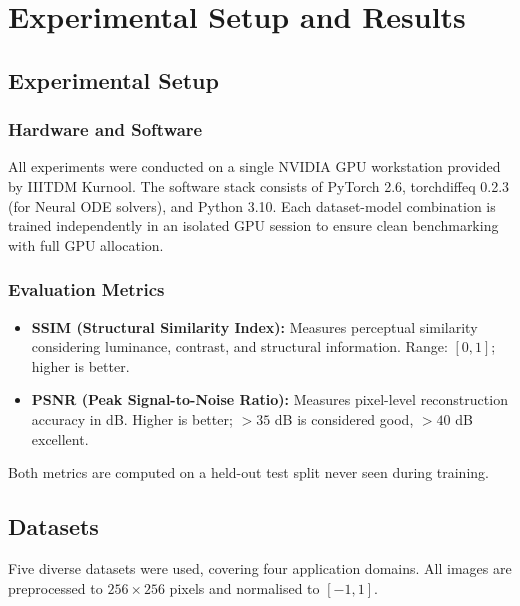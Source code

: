 \chapter{Experimental Setup and Results}
\label{Chapter5}

\section{Experimental Setup}

\subsection{Hardware and Software}

All experiments were conducted on a single NVIDIA GPU workstation provided by IIITDM Kurnool. The software stack consists of PyTorch 2.6, torchdiffeq 0.2.3 (for Neural ODE solvers), and Python 3.10. Each dataset-model combination is trained independently in an isolated GPU session to ensure clean benchmarking with full GPU allocation.

\subsection{Evaluation Metrics}

\begin{itemize}
    \item \textbf{SSIM (Structural Similarity Index):} Measures perceptual similarity considering luminance, contrast, and structural information. Range: $[0, 1]$; higher is better.
    \item \textbf{PSNR (Peak Signal-to-Noise Ratio):} Measures pixel-level reconstruction accuracy in dB. Higher is better; $>35$ dB is considered good, $>40$ dB excellent.
\end{itemize}

Both metrics are computed on a held-out test split never seen during training.

\section{Datasets}

Five diverse datasets were used, covering four application domains. All images are preprocessed to $256 \times 256$ pixels and normalised to $[-1, 1]$.


